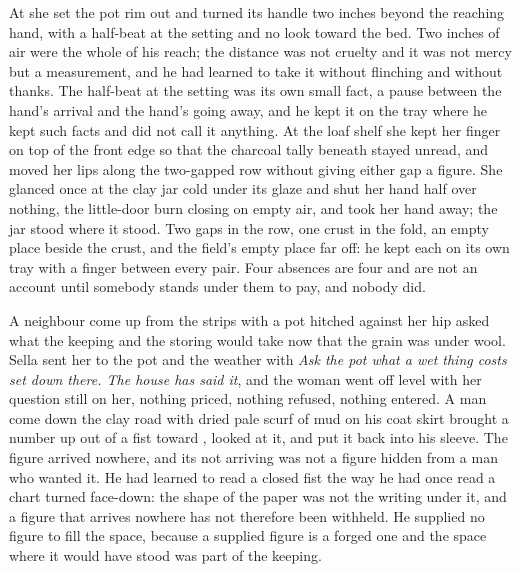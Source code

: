 \scenebreak

At  she set the pot rim out and turned its handle two inches beyond the reaching hand, with a half-beat at the setting and no look toward the bed. Two inches of air were the whole of his reach; the distance was not cruelty and it was not mercy but a measurement, and he had learned to take it without flinching and without thanks. The half-beat at the setting was its own small fact, a pause between the hand's arrival and the hand's going away, and he kept it on the tray where he kept such facts and did not call it anything. At the loaf shelf she kept her finger on top of the front edge so that the charcoal tally beneath stayed unread, and moved her lips along the two-gapped row without giving either gap a figure. She glanced once at the clay jar cold under its glaze and shut her hand half over nothing, the little-door burn closing on empty air, and took her hand away; the jar stood where it stood. Two gaps in the row, one crust in the fold, an empty place beside the crust, and the field's empty place far off: he kept each on its own tray with a finger between every pair. Four absences are four and are not an account until somebody stands under them to pay, and nobody did.

\scenebreak

A neighbour come up from the strips with a pot hitched against her hip asked what the keeping and the storing would take now that the grain was under wool. Sella sent her to the pot and the weather with \emph{Ask the pot what a wet thing costs set down there. The house has said it}, and the woman went off level with her question still on her, nothing priced, nothing refused, nothing entered. A man come down the clay road with dried pale scurf of mud on his coat skirt brought a number up out of a fist toward , looked at it, and put it back into his sleeve. The figure arrived nowhere, and its not arriving was not a figure hidden from a man who wanted it. He had learned to read a closed fist the way he had once read a chart turned face-down: the shape of the paper was not the writing under it, and a figure that arrives nowhere has not therefore been withheld. He supplied no figure to fill the space, because a supplied figure is a forged one and the space where it would have stood was part of the keeping.

\scenebreak


